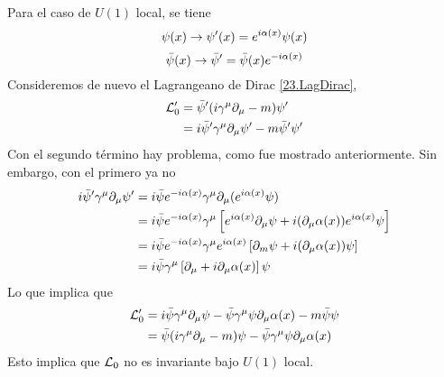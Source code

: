 Para el caso de $U(1)$ local, se tiene
\begin{equation}
  \psi(x)\to \psi'(x)=e^{i\alpha (x)}\psi(x)
\end{equation}
\begin{equation}
  \bar{\psi}(x)\to \bar{\psi}'=\bar{\psi}(x)e^{-i\alpha (x)}
\end{equation}
Consideremos de nuevo el Lagrangeano de Dirac \eqref{23.LagDirac},
\begin{align}
  \mathcal{L}'_0&=\bar{\psi}'(i\gamma^\mu \partial_\mu -m)\psi'\\
  &=i\bar{\psi}'\gamma^\mu \partial_\mu \psi'-m\bar{\psi}'\psi'
\end{align}
Con el segundo término hay problema, como fue mostrado anteriormente. Sin embargo, con el primero ya no
\begin{align}
  i\bar{\psi}'\gamma^\mu \partial_\mu \psi'&=i\bar{\psi}e^{-i\alpha (x)}\gamma^\mu \partial_\mu (e^{i\alpha (x)}\psi)\\
  &=i\bar{\psi}e^{-i\alpha (x)}\gamma^\mu \left[e^{i\alpha (x)}\partial_\mu \psi+i(\partial_\mu \alpha(x))e^{i\alpha (x)}\psi\right]\\
  &=i\bar{\psi}e^{-i\alpha (x)}\gamma^\mu e^{i\alpha (x)}\left[\partial_m\psi +i (\partial_\mu \alpha(x))\psi\right]\\
  &=i\bar{\psi}\gamma^\mu \left[\partial_\mu +i\partial_\mu \alpha (x)\right]\psi
\end{align}
Lo que implica que
\begin{align}
  \mathcal{L}'_0 &=i\bar{\psi}\gamma^\mu \partial_\mu \psi-\bar{\psi}\gamma^\mu \psi\partial_\mu \alpha(x)-m\bar{\psi}\psi\\
  &=\bar{\psi}(i\gamma^\mu \partial_\mu -m)\psi-\bar{\psi}\gamma^\mu \psi\partial_\mu \alpha(x)
\end{align}
Esto implica que $\mathcal{L}_0$ no es invariante bajo $U(1)$ local.



















































